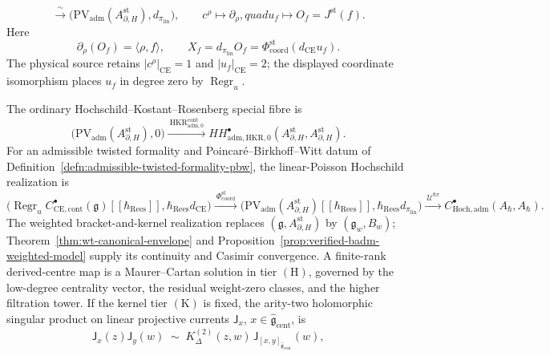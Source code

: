 \documentclass[11pt]{memoir}
\begin{document}
\begin{thm}
\begin{equation}
    \xrightarrow{\ \sim\ }
    \bigl(\mathrm{PV}_{\mathrm{adm}}
      (A_{\partial,H}^{\mathrm{st}}),d_{\pi_{\mathrm{lin}}}\bigr),
    \qquad
    c^\rho\longmapsto\partial_\rho,quad
    u_f\longmapsto O_f=J^{\mathrm{st}}(f).
  \end{equation}
  Here
  \[
    \partial_\rho(O_f)=\langle\rho,f\rangle,
    \qquad
    X_f=d_{\pi_{\mathrm{lin}}}O_f
       =\Phi_{\mathrm{coord}}^{\mathrm{st}}(d_{\mathrm{CE}}u_f).
  \]
  The physical source retains
  \(|c^\rho|_{\mathrm{CE}}=1\) and \(|u_f|_{\mathrm{CE}}=2\); the
  displayed coordinate isomorphism places \(u_f\) in degree zero by
  \(\operatorname{Regr}_u\).

  The ordinary Hochschild--Kostant--Rosenberg special fibre is
  \[
    \bigl(\mathrm{PV}_{\mathrm{adm}}
      (A_{\partial,H}^{\mathrm{st}}),0\bigr)
    \xrightarrow{\ \operatorname{HKR}^{\mathrm{cont}}_{\mathrm{adm},0}\ }
    HH^\bullet_{\mathrm{adm},\mathrm{HKR},0}
      (A_{\partial,H}^{\mathrm{st}},A_{\partial,H}^{\mathrm{st}}).
  \]
  For an admissible twisted formality and Poincar\'e--Birkhoff--Witt
  datum of Definition~\ref{defn:admissible-twisted-formality-pbw}, the
  linear-Poisson Hochschild realization is
  \[
    \bigl(\operatorname{Regr}_u
      C^\bullet_{\mathrm{CE},\mathrm{cont}}(\mathfrak g)
      [[\hbar_{\mathrm{Rees}}]],
      \hbar_{\mathrm{Rees}}d_{\mathrm{CE}}\bigr)
    \xrightarrow{\ \Phi_{\mathrm{coord}}^{\mathrm{st}}\ }
    \bigl(\mathrm{PV}_{\mathrm{adm}}(A_{\partial,H}^{\mathrm{st}})
      [[\hbar_{\mathrm{Rees}}]],
      \hbar_{\mathrm{Rees}}d_{\pi_{\mathrm{lin}}}\bigr)
    \xrightarrow{\ \mathcal U^{\hbar\pi}\ }
    C^\bullet_{\mathrm{Hoch},\mathrm{adm}}(A_\hbar,A_\hbar).
  \]
  The weighted bracket-and-kernel realization replaces
  \((\mathfrak g,A_{\partial,H}^{\mathrm{st}})\) by
  \((\mathfrak g_w,B_w)\); Theorem~\ref{thm:wt-canonical-envelope}
  and Proposition~\ref{prop:verified-badm-weighted-model} supply its
  continuity and Casimir convergence.  A finite-rank derived-centre map
  is a Maurer--Cartan solution in tier \(\mathrm{(H)}\), governed by the
  low-degree centrality vector, the residual weight-zero classes, and
  the higher filtration tower.
  If the kernel tier \(\mathrm{(K)}\) is fixed, the arity-two holomorphic singular product on linear projective currents
  $\mathsf J_x$, $x\in\widehat{\mathfrak g}_{\mathrm{cent}}$, is
  \begin{equation}\label{eq:singular-product-linear}
    \mathsf J_x(z)\mathsf J_y(w)\;\sim\;
    K^{(2)}_\Delta(z,w)\,
      \mathsf J_{[x,y]_{\widehat{\mathfrak g}_{\mathrm{cent}}}}(w),

\end{equation}
\end{thm}
\end{document}
